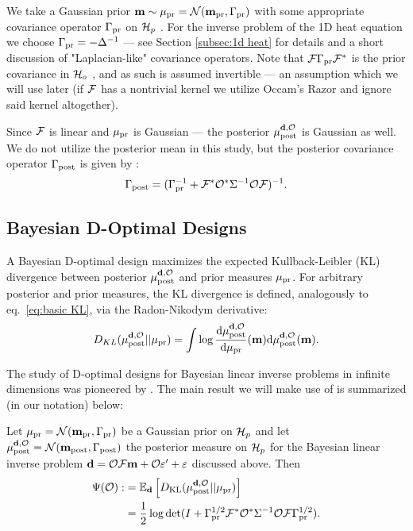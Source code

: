 We take a Gaussian prior \(\mathbf{m} \sim \mu_{\textup{pr}} = \mathcal{N}(\mathbf{m}_{\textup{pr}}
,\Gamma_{\textup{pr}})\) with some appropriate covariance operator \(\Gamma_{\textup{pr}}\) on
\(\mathcal{H}_p\) \cite{Stuart10}. For the inverse problem of the 1D heat
equation we choose $\Gamma_{\textup{pr}} = -\Delta^{-1}$ --- see Section
\ref{subsec:1d heat} for details and a short discussion of
"Laplacian-like" covariance operators. Note that \(\mathcal{F} \Gamma_{\textup{pr}}
\mathcal{F}^*\) is the prior covariance in \(\mathcal{H}_o\) \cite{Stuart10}, and as
such is assumed invertible --- an assumption which we will use later
(if \(\mathcal{F}\) has a nontrivial kernel we utilize Occam's Razor and
ignore said kernel altogether).

Since $\mathcal{F}$ is linear and $\mu_{\textup{pr}}$ is Gaussian --- the posterior
\(\mu_{\textup{post}}^{\mathbf{d}, \mathcal{O}}\) is Gaussian as well. We do not utilize the posterior mean in
this study, but the posterior covariance operator $\Gamma_{\textup{post}}$ is given
by \cite{Stuart10}:
\begin{align}\label{eq:postcov}
  \postcov = (\prcov^{-1} + \fwd^* \obs^* \Sigma^{-1} \obs \fwd
  )^{-1}.
\end{align}

\subsection{Bayesian D-Optimal Designs}\label{subsec:D optimal design} 
A Bayesian D-optimal design maximizes the expected Kullback-Leibler
(KL) divergence between posterior \(\mu_{\textup{post}}^{\mathbf{d}, \mathcal{O}}\) and prior measures
\(\mu_{\textup{pr}}\). For arbitrary posterior and prior measures, the KL divergence
is defined, analogously to eq.~\ref{eq:basic KL}, via the
Radon-Nikodym derivative:
\begin{equation*}
  D_{KL}(\post||\pr) = \int \log \frac{\der \post}{\der \pr}(\param) \der \post(\param).
\end{equation*}

The study of D-optimal designs for Bayesian linear inverse problems in
infinite dimensions was pioneered by \cite{AlexanderianGloorGhattas14,
  alexanderian2018efficient}. The main result we will make use of is
summarized (in our notation) below:

\begin{theorem}\label{thm:d optimality}
  Let \(\mu_{\textup{pr}} = \mathcal{N}(\mathbf{m}_{\textup{pr}},\Gamma_{\textup{pr}})\) be a Gaussian prior on \(\mathcal{H}_p\)
  and let \(\mu_{\textup{post}}^{\mathbf{d}, \mathcal{O}} = \mathcal{N}(\mathbf{m}_{\textup{post}},\Gamma_{\textup{post}})\) the posterior measure
  on \(\mathcal{H}_p\) for the Bayesian linear inverse problem \(\mathbf{d} = \mathcal{O}
  \mathcal{F}\mathbf{m} + \mathcal{O} \varepsilon' + \varepsilon\) discussed above. Then
  \begin{align}\label{eq:objective}
    \begin{split}
      \tar( \obs) :&= \mathbb{E}_{\data}\left [ D_{\text{KL}} (\post || \pr ) \right ] \\
      &= \frac12 \log \det 
      ( I + \prcov^{1/2}  \fwd ^* \obs^* \Sigma^{-1} \obs \fwd \prcov^{1/2}).
    \end{split}
  \end{align}
\end{theorem}

